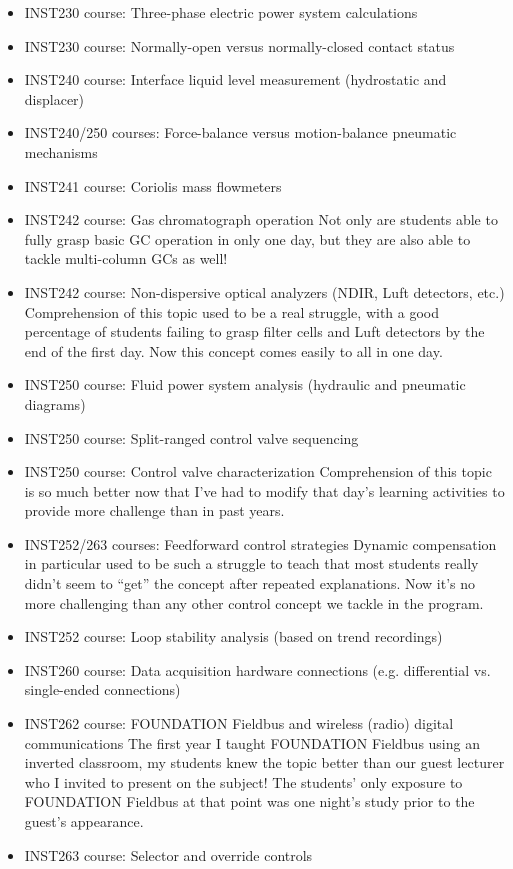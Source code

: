 \begin{itemize}
\item{} INST230 course: Three-phase electric power system calculations
\item{} INST230 course: Normally-open versus normally-closed contact status
\item{} INST240 course: Interface liquid level measurement (hydrostatic and displacer)
\item{} INST240/250 courses: Force-balance versus motion-balance pneumatic mechanisms
\item{} INST241 course: Coriolis mass flowmeters
\item{} INST242 course: Gas chromatograph operation
\itemitem{} Not only are students able to fully grasp basic GC operation in only one day, but they are also able to tackle multi-column GCs as well!
\item{} INST242 course: Non-dispersive optical analyzers (NDIR, Luft detectors, etc.)
\itemitem{} Comprehension of this topic used to be a real struggle, with a good percentage of students failing to grasp filter cells and Luft detectors by the end of the first day.  Now this concept comes easily to all in one day.
\item{} INST250 course: Fluid power system analysis (hydraulic and pneumatic diagrams)
\item{} INST250 course: Split-ranged control valve sequencing
\item{} INST250 course: Control valve characterization
\itemitem{} Comprehension of this topic is so much better now that I've had to modify that day's learning activities to provide more challenge than in past years.
\item{} INST252/263 courses: Feedforward control strategies
\itemitem{} Dynamic compensation in particular used to be such a struggle to teach that most students really didn't seem to ``get'' the concept after repeated explanations.  Now it's no more challenging than any other control concept we tackle in the program.
\item{} INST252 course: Loop stability analysis (based on trend recordings)
\item{} INST260 course: Data acquisition hardware connections (e.g. differential vs. single-ended connections)
\item{} INST262 course: FOUNDATION Fieldbus and wireless (radio) digital communications
\itemitem{} The first year I taught FOUNDATION Fieldbus using an inverted classroom, my students knew the topic better than our guest lecturer who I invited to present on the subject!  The students' only exposure to FOUNDATION Fieldbus at that point was one night's study prior to the guest's appearance.
\item{} INST263 course: Selector and override controls
\end{itemize}

